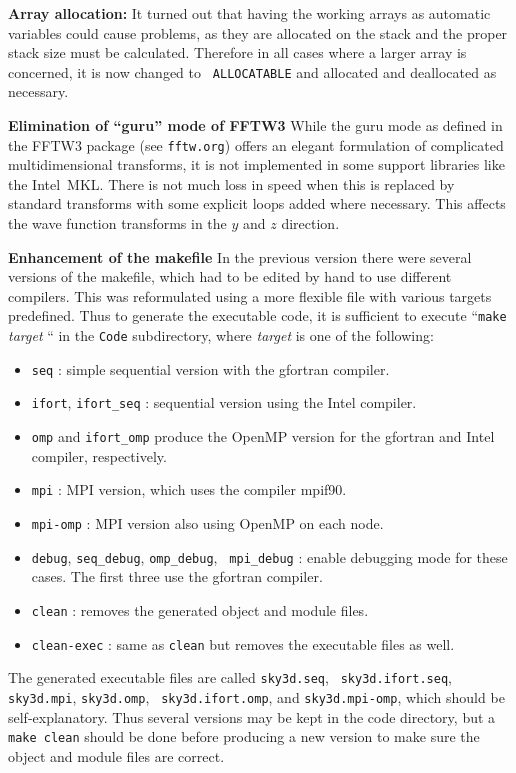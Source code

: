 \documentclass[final,1p,twocolumn]{elsarticle}
\begin{document}
\begin{small}
{\bf Array allocation:} It turned out that having the working arrays
as automatic variables could cause problems, as they are allocated on
the stack and the proper stack size must be calculated. Therefore in
all cases where a larger array is concerned, it is now changed to {\tt
  ALLOCATABLE} and allocated and deallocated as necessary.

{\bf Elimination of ``guru'' mode of FFTW3} While the guru mode as
defined in the FFTW3 package (see {\tt fftw.org}) offers an elegant
formulation of complicated multidimensional transforms, it is not
implemented in some support libraries like the Intel\textregistered\
MKL. There is not much loss in speed when this is replaced by
standard transforms with some explicit loops added where
necessary. This affects the wave function transforms in the $y$ and
$z$ direction.

{\bf Enhancement of the makefile} In the previous version there were
several versions of the makefile, which had to be edited by hand to
use different compilers. This was reformulated using a more flexible
file with various targets predefined. Thus to generate the executable
code, it is sufficient to execute ``{\tt make} {\em target} `` in the
{\tt Code} subdirectory, where {\em target} is one of the following:

\begin{itemize}
\item {\tt seq} : simple sequential version with the gfortran compiler.
\item {\tt ifort}, {\tt ifort\_seq} : sequential version using the Intel compiler. 
\item {\tt omp} and {\tt ifort\_omp} produce the OpenMP version for
  the gfortran and Intel compiler, respectively.
\item {\tt mpi} : MPI version, which uses the compiler mpif90.
\item {\tt mpi-omp} : MPI version also using OpenMP on each node.
\item {\tt debug}, {\tt seq\_debug}, {\tt omp\_debug}, {\tt
    mpi\_debug} : enable debugging mode for these cases. The first
  three use the gfortran compiler.
\item {\tt clean} : removes the generated object and module files.
\item {\tt clean-exec} : same as {\tt clean} but removes the
  executable files as well.
\end{itemize}

The generated executable files are called {\tt sky3d.seq}, {\tt
  sky3d.ifort.seq}, {\tt sky3d.mpi}, {\tt sky3d.omp}, {\tt
  sky3d.ifort.omp}, and {\tt sky3d.mpi-omp}, which should be
self-explanatory. Thus several versions may be kept in the code
directory, but a {\tt make clean} should be done before producing a
new version to make sure the object and module files are correct.


\end{small}
\end{document}
